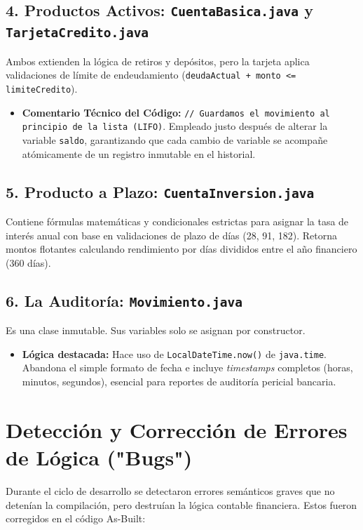 \documentclass[12pt, letterpaper]{article}
\begin{document}
	\subsection{4. Productos Activos: \texttt{CuentaBasica.java} y \texttt{TarjetaCredito.java}}
	Ambos extienden la lógica de retiros y depósitos, pero la tarjeta aplica validaciones de límite de endeudamiento (\texttt{deudaActual + monto <= limiteCredito}).
	\begin{itemize}
		\item \textbf{Comentario Técnico del Código:} \texttt{// Guardamos el movimiento al principio de la lista (LIFO)}. Empleado justo después de alterar la variable \texttt{saldo}, garantizando que cada cambio de variable se acompañe atómicamente de un registro inmutable en el historial.
	\end{itemize}
	
	\subsection{5. Producto a Plazo: \texttt{CuentaInversion.java}}
	Contiene fórmulas matemáticas y condicionales estrictas para asignar la tasa de interés anual con base en validaciones de plazo de días (28, 91, 182). Retorna montos flotantes calculando rendimiento por días divididos entre el año financiero (360 días).
	
	\subsection{6. La Auditoría: \texttt{Movimiento.java}}
	Es una clase inmutable. Sus variables solo se asignan por constructor.
	\begin{itemize}
		\item \textbf{Lógica destacada:} Hace uso de \texttt{LocalDateTime.now()} de \texttt{java.time}. Abandona el simple formato de fecha e incluye \textit{timestamps} completos (horas, minutos, segundos), esencial para reportes de auditoría pericial bancaria.
	\end{itemize}
	
	\section{Detección y Corrección de Errores de Lógica ("Bugs")}
	Durante el ciclo de desarrollo se detectaron errores semánticos graves que no detenían la compilación, pero destruían la lógica contable financiera. Estos fueron corregidos en el código As-Built:
	
\end{document}

